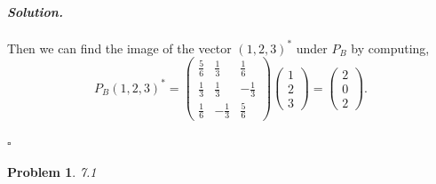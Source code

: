 \documentclass[12pt]{report}
\newtheorem{problem}{Problem}
\newenvironment{solution}[1][\it{Solution}]{\textbf{#1. } }{$\square$}
\begin{document}
\begin{solution}
\begin{enumerate}
\begin{align*}
        \end{align*}
        Then we can find the image of the vector $(1,2,3)^*$ under $P_B$ by computing,
        \[
            P_B(1,2,3)^* = \begin{pmatrix}\frac{5}{6}&\frac{1}{3}&\frac{1}{6}\\ \frac{1}{3}&\frac{1}{3}&-\frac{1}{3}\\ \frac{1}{6}&-\frac{1}{3}&\frac{5}{6}\end{pmatrix} \begin{pmatrix}
                1\\2\\3
            \end{pmatrix} = \begin{pmatrix}2\\0\\2\end{pmatrix}.
        \]
    \end{enumerate}
\end{solution}

\newpage



\begin{problem}
    7.1
\end{problem}
\end{document}
